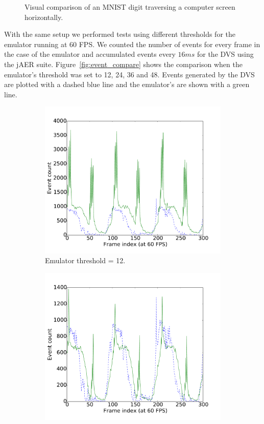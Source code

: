\documentclass[conference]{IEEEtran}
\begin{document}
\begin{figure}[htb]
  \caption{Visual comparison of an MNIST digit traversing a computer screen horizontally.}
  \label{fig:dvs_vs_cam}
  
\end{figure}

With the same setup we performed tests using different thresholds for the emulator running at 60 FPS. We counted the number of events for every frame in the case of the emulator and accumulated events every $16 ms$ for the DVS using the jAER suite. 
Figure~\ref{fig:event_compare} shows the comparison when the emulator's threshold was set to 12, 24, 36 and 48. Events generated by the DVS are plotted with a dashed blue line and the emulator's are shown with a green line.

\begin{figure}[htb]
  \captionsetup[subfigure]{justification=centering}
  \centering
  \begin{subfigure}[b]{0.24\textwidth}
    \includegraphics[width=\textwidth]{event_compare_12}
    \caption{Emulator threshold = 12.}
    \label{fig:comp_12}
  \end{subfigure}
  \begin{subfigure}[b]{0.24\textwidth}
    \includegraphics[width=\textwidth]{event_compare_24}

\end{subfigure}
\end{figure}
\end{document}
